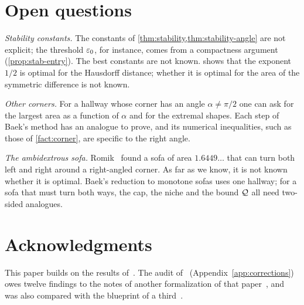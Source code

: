 \section{Open questions}\label{sec:questions}

\emph{Stability constants.} The constants of
\cref{thm:stability,thm:stability-angle} are not explicit; the threshold
$\varepsilon_0$, for instance, comes from a compactness argument
(\cref{prop:stab-entry}). The best constants are not known.
 shows that the exponent $1/2$ is optimal for the
Hausdorff distance; whether it is optimal for the area of the symmetric
difference is not known.

\emph{Other corners.} For a hallway whose corner has an angle $\alpha\ne\pi/2$
one can ask for the largest area as a function of $\alpha$ and for the extremal
shapes. Each step of Baek's method has an analogue to prove, and its numerical
inequalities, such as those of \cref{fact:corner}, are specific to the right
angle.

\emph{The ambidextrous sofa.} Romik~\cite{Romik18} found a sofa of area
$1.6449\ldots$ that can turn both left and right around a right-angled corner.
As far as we know, it is not known whether it is optimal. Baek's reduction to
monotone sofas uses one hallway; for a sofa that must turn both ways, the cap,
the niche and the bound $\mathcal{Q}$ all need two-sided analogues.

\section*{Acknowledgments}
This paper builds on the results of~\cite{Baek}. The audit of~\cite{Baek}
(Appendix~\ref{app:corrections}) owes
twelve findings to the notes of another formalization of that
paper~\cite{Cureton}, and was also compared with the blueprint of a
third~\cite{Cao}.
